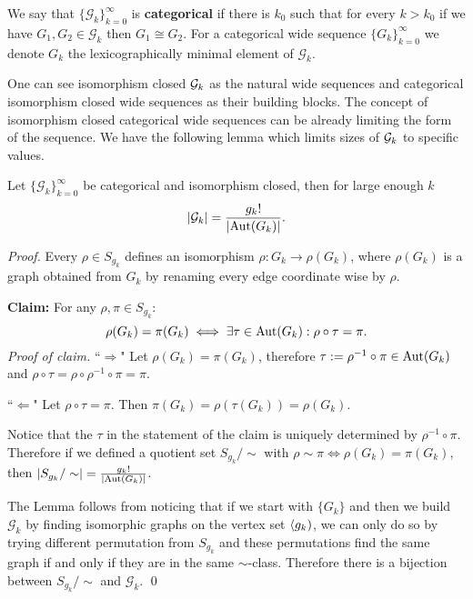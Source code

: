 \begin{defi}\label{lemmisocat}
We say that $\{\mathcal{G}_k\}_{k=0}^\infty$ is \textbf{categorical} if there is $k_0$ such that for every $k>k_0$ if we have $G_1,G_2\in\mathcal{G}_k$ then $G_1\cong G_2$. For a categorical wide sequence $\{G_k\}_{k=0}^\infty$ we denote $G_k$ the lexicographically minimal element of $\mathcal{G}_k$.
\end{defi}

One can see isomorphism closed $\mathcal{G}_k$ as the natural wide sequences and categorical isomorphism closed wide sequences as their building blocks. The concept of isomorphism closed categorical wide sequences can be already limiting the form of the sequence. We have the following lemma which limits sizes of $\mathcal{G}_k$ to specific values.

\begin{lemm}
Let $\{\mathcal{G}_k\}_{k=0}^\infty$ be categorical and isomorphism closed, then for large enough $k$
\[\left|{\mathcal{G}_k}\right|=\frac{g_k!}{\left|{\text{Aut}(G_k)}\right|}.\]
\end{lemm}
\begin{proof}
Every $\rho\in S_{g_k}$ defines an isomorphism $\rho:G_k\to\rho(G_k)$, where $\rho(G_k)$ is a graph obtained from $G_k$ by renaming every edge coordinate wise by $\rho$.

{}
\textbf{Claim:} For any $\rho,\pi\in S_{g_k}$:
\[\rho(G_k)=\pi(G_k)\iff\exists \tau\in\text{Aut}(G_k):\rho\circ\tau=\pi.\]
\textit{Proof of claim.} ``$\Rightarrow$" Let $\rho(G_k)=\pi(G_k)$, therefore $\tau:=\rho^{-1}\circ\pi\in\text{Aut}(G_k)$ and $\rho\circ\tau=\rho\circ\rho^{-1}\circ\pi=\pi.$

``$\Leftarrow$" Let $\rho\circ\tau=\pi$. Then $\pi(G_k)=\rho(\tau(G_k))=\rho(G_k).$ \qedhere

Notice that the $\tau$ in the statement of the claim is uniquely determined by $\rho^{-1}\circ\pi$. Therefore if we defined a quotient set $S_{g_k}/\sim$ with $\rho\sim\pi\iff\rho(G_k)=\pi(G_k)$, then $\left|{S_{g_k}/\sim}\right|=\frac{g_k!}{\left|{\text{Aut}(G_k)}\right|}$.

The Lemma follows from noticing that if we start with $\{G_k\}$ and then we build $\mathcal{G}_k$ by finding isomorphic graphs on the vertex set $\langle g_k)$, we can only do so by trying different permutation from $S_{g_k}$ and these permutations find the same graph if and only if they are in the same $\sim$-class. Therefore there is a bijection between $S_{g_k}/\sim$ and $\mathcal{G}_k$. \qed
\end{proof}

